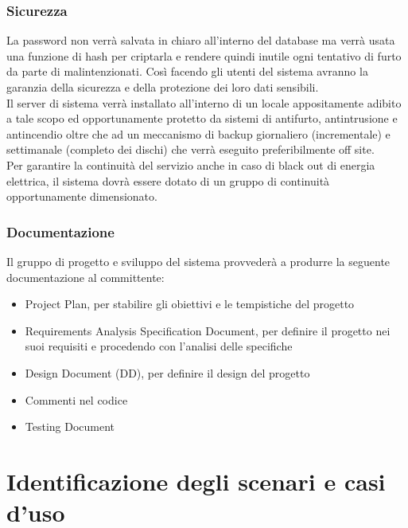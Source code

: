 \documentclass[a4paper,12pt]{article}
\begin{document}
\subsubsection{Sicurezza}
La password non verrà salvata in chiaro all'interno del database ma verrà usata una funzione di hash per criptarla e rendere quindi inutile ogni tentativo di furto da parte di malintenzionati. Così facendo gli utenti del sistema avranno la garanzia della sicurezza e della protezione dei loro dati sensibili. \\[1\baselineskip]
Il server di sistema verrà installato all'interno di un locale appositamente adibito a tale scopo ed opportunamente protetto da sistemi di antifurto, antintrusione e antincendio oltre che ad un meccanismo di backup giornaliero (incrementale) e settimanale (completo dei dischi) che verrà eseguito preferibilmente off site. \\[1\baselineskip]
Per garantire la continuità del servizio anche in caso di black out di energia elettrica, il sistema dovrà essere dotato di un gruppo di continuità opportunamente dimensionato.
\\[1.5em]
\subsubsection{Documentazione}
Il gruppo di progetto e sviluppo del sistema provvederà a produrre la seguente documentazione al committente:
\begin{itemize}
\item Project Plan, per stabilire gli obiettivi e le tempistiche del progetto
\item Requirements Analysis Specification Document, per definire il progetto nei suoi requisiti e procedendo con l’analisi delle specifiche
\item Design Document (DD), per definire il design del progetto
\item Commenti nel codice
\item Testing Document
\end{itemize}
\clearpage

\section{Identificazione degli scenari e casi d'uso}
\end{document}
